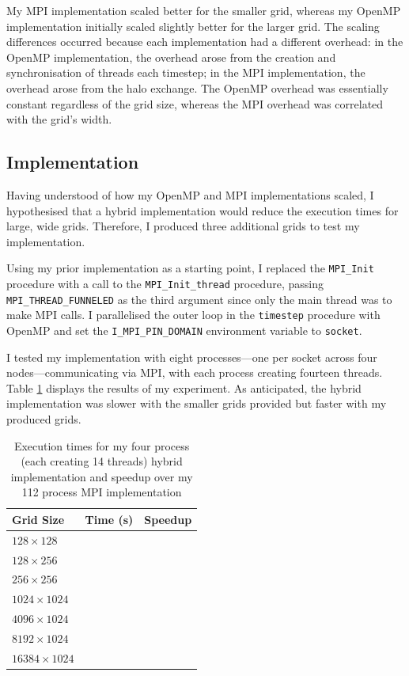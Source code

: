 \documentclass[twocolumn, a4paper]{article}
\begin{document}
My MPI implementation scaled better for the smaller grid, whereas my OpenMP implementation initially scaled slightly better for the larger grid.
The scaling differences occurred because each implementation had a different overhead: in the OpenMP implementation, the overhead arose from the creation and synchronisation of threads each timestep; in the MPI implementation, the overhead arose from the halo exchange.
The OpenMP overhead was essentially constant regardless of the grid size, whereas the MPI overhead was correlated with the grid's width.

\subsection{Implementation}

Having understood of how my OpenMP and MPI implementations scaled, I hypothesised that a hybrid implementation would reduce the execution times for large, wide grids.
Therefore, I produced three additional grids to test my implementation.

Using my prior implementation as a starting point, I replaced the \texttt{MPI\_Init} procedure with a call to the \texttt{MPI\_Init\_thread} procedure, passing \texttt{MPI\_THREAD\_FUNNELED} as the third argument since only the main thread was to make MPI calls.
I parallelised the outer loop in the \texttt{timestep} procedure with OpenMP and set the \texttt{I\_MPI\_PIN\_DOMAIN} environment variable to \texttt{socket}.

I tested my implementation with eight processes---one per socket across four nodes---communicating via MPI, with each process creating fourteen threads.
Table \ref{tab:hybrid} displays the results of my experiment.
As anticipated, the hybrid implementation was slower with the smaller grids provided but faster with my produced grids.

\begin{table}[htbp]
  \begin{center}
  \caption{Execution times for my four process (each creating 14 threads) hybrid implementation and speedup over my 112 process MPI implementation}\label{tab:hybrid}
  \begin{tabular}[t]{l | l l} 
      \hline\hline
      Grid Size&Time (s)&Speedup\\
      \hline
      $128 \times 128$&\texttt{}&\texttt{}\\
      $128 \times 256$&\texttt{}&\texttt{}\\
      $256 \times 256$&\texttt{}&\texttt{}\\
      $1024 \times 1024$&\texttt{}&\texttt{}\\
      \hdashline
      $4096 \times 1024$&\texttt{}&\texttt{}\\
      $8192 \times 1024$&\texttt{}&\texttt{}\\
      $16384 \times 1024$&\texttt{}&\texttt{}\\
      \hline
    \end{tabular}
  \end{center}
  \vspace{-1em}
\end{table}
\end{document}
